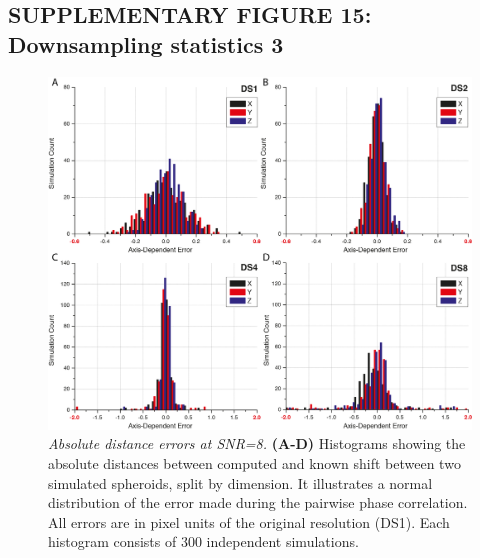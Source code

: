 \documentclass[]{spie}  %
\begin{document}
\subsection*{SUPPLEMENTARY FIGURE 15: Downsampling statistics 3}
\vspace{1mm}
\begin{figure}[h!]
\includegraphics[width=\textwidth]{fig-downsampling-statistics-2.png}
\vspace{-2.0mm}
\caption{\hspace{-0.5mm} \emph{Absolute distance errors at SNR=8.} \textbf{(A-D)}  Histograms showing the absolute distances between computed and known shift between two simulated spheroids, split by dimension. It illustrates a normal distribution of the error made during the pairwise phase correlation. All errors are in pixel units of the original resolution (DS1). Each histogram consists of 300 independent simulations.
}
\label{fig:sup-fig-downsampling-statistics-2}
\end{figure}

\pagebreak
\end{document}
